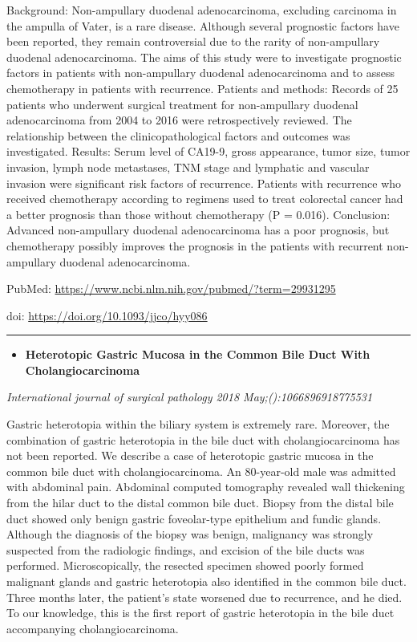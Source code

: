 \documentclass[]{article}
\providecommand{\tightlist}{%
  \setlength{\itemsep}{0pt}\setlength{\parskip}{0pt}}
\begin{document}
Background: Non-ampullary duodenal adenocarcinoma, excluding carcinoma
in the ampulla of Vater, is a rare disease. Although several prognostic
factors have been reported, they remain controversial due to the rarity
of non-ampullary duodenal adenocarcinoma. The aims of this study were to
investigate prognostic factors in patients with non-ampullary duodenal
adenocarcinoma and to assess chemotherapy in patients with recurrence.
Patients and methods: Records of 25 patients who underwent surgical
treatment for non-ampullary duodenal adenocarcinoma from 2004 to 2016
were retrospectively reviewed. The relationship between the
clinicopathological factors and outcomes was investigated. Results:
Serum level of CA19-9, gross appearance, tumor size, tumor invasion,
lymph node metastases, TNM stage and lymphatic and vascular invasion
were significant risk factors of recurrence. Patients with recurrence
who received chemotherapy according to regimens used to treat colorectal
cancer had a better prognosis than those without chemotherapy (P =
0.016). Conclusion: Advanced non-ampullary duodenal adenocarcinoma has a
poor prognosis, but chemotherapy possibly improves the prognosis in the
patients with recurrent non-ampullary duodenal adenocarcinoma.

PubMed: \url{https://www.ncbi.nlm.nih.gov/pubmed/?term=29931295}

doi: \url{https://doi.org/10.1093/jjco/hyy086}

{}

{}

\begin{center}\rule{0.5\linewidth}{\linethickness}\end{center}

\begin{itemize}
\tightlist
\item
  \textbf{Heterotopic Gastric Mucosa in the Common Bile Duct With
  Cholangiocarcinoma}
\end{itemize}

\emph{International journal of surgical pathology 2018
May;():1066896918775531}

Gastric heterotopia within the biliary system is extremely rare.
Moreover, the combination of gastric heterotopia in the bile duct with
cholangiocarcinoma has not been reported. We describe a case of
heterotopic gastric mucosa in the common bile duct with
cholangiocarcinoma. An 80-year-old male was admitted with abdominal
pain. Abdominal computed tomography revealed wall thickening from the
hilar duct to the distal common bile duct. Biopsy from the distal bile
duct showed only benign gastric foveolar-type epithelium and fundic
glands. Although the diagnosis of the biopsy was benign, malignancy was
strongly suspected from the radiologic findings, and excision of the
bile ducts was performed. Microscopically, the resected specimen showed
poorly formed malignant glands and gastric heterotopia also identified
in the common bile duct. Three months later, the patient's state
worsened due to recurrence, and he died. To our knowledge, this is the
first report of gastric heterotopia in the bile duct accompanying
cholangiocarcinoma.
\end{document}
